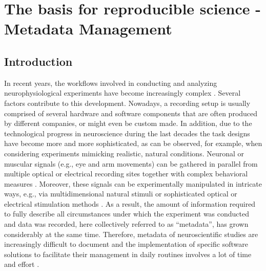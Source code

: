 \clearpage
\section{The basis for reproducible science - Metadata Management}
\label{sec:metadata}



\subsection{Introduction}
\label{sec:Introduction}

In recent years, the workflows involved in conducting and analyzing neurophysiological experiments have become increasingly complex \citep[e.g.][]{Coles_2008, Denker_2016, Brochier_2018}. Several factors contribute to this development. Nowadays, a recording setup is usually comprised of several hardware and software components that are often produced by different companies, or might even be custom made. In addition, due to the technological progress in neuroscience during the last decades the task designs have become more and more sophisticated, as can be observed, for example, when considering experiments mimicking realistic, natural conditions. Neuronal or muscular signals (e.g., eye and arm movements) can be gathered in parallel from multiple optical or electrical recording sites \citep{Nicolelis_2002,Verkhratsky_2006,Obien_2014} together with complex behavioral measures \citep{Jacob_2010,Maldonado_2008,Vargas-Irwin_2010,Schwarz_2014}. Moreover, these signals can be experimentally manipulated in intricate ways, e.g., via multidimensional natural stimuli \citep{Geisler_2008} or sophisticated optical or electrical stimulation methods \citep{Deisseroth_2013,Miyamoto_2015}. As a result, the amount of information required to fully describe all circumstances under which the experiment was conducted and data was recorded, here collectively referred to as ``metadata'', has grown considerably at the same time. Therefore, metadata of neuroscientific studies are increasingly difficult to document and the implementation of specific software solutions to facilitate their management in daily routines involves a lot of time and effort \citep{Zehl_2016}.

